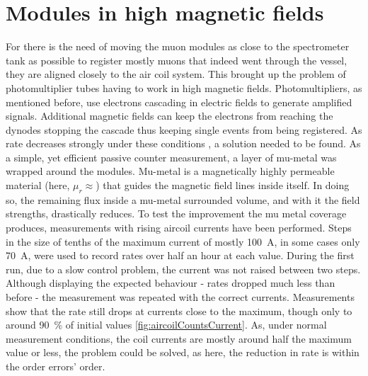   \section{Modules in high magnetic fields}
  \label{ch:Analysis:sec:Modules in high magnetic fields}
  For there is the need of moving the muon modules as close to the spectrometer tank as possible to register mostly muons that indeed went through the vessel, they are aligned closely to the air coil system. This brought up the problem of photomultiplier tubes having to work in high magnetic fields. Photomultipliers, as mentioned before, use electrons cascading in electric fields to generate amplified signals. Additional magnetic fields can keep the electrons from reaching the dynodes stopping the cascade thus keeping single events from being registered. As rate decreases strongly under these conditions , a solution needed to be found. As a simple, yet efficient passive counter measurement, a layer of mu-metal was wrapped around the modules. Mu-metal is a magnetically highly permeable material (here, $\mu_r\approx $) that guides the magnetic field lines inside itself. In doing so, the remaining flux inside a mu-metal surrounded volume, 
and with it the field strengths, drastically reduces.
  To test the improvement the mu metal coverage produces, measurements with rising aircoil currents have been performed.
  Steps in the size of tenths of the maximum current of mostly \SI{100}{\ampere}, in some cases only \SI{70}{\ampere}, were used to record rates over half an hour at each value.
  During the first run, due to a slow control problem, the current was not raised between two steps. Although displaying the expected behaviour - rates dropped much less than before - the measurement was repeated with the correct currents.
  Measurements show that the rate still drops at currents close to the maximum, though only to around \SI{90}{\percent} of initial values \ref{fig:aircoilCountsCurrent}. As, under normal measurement conditions, the coil currents are mostly around half the maximum value or less, the problem could be solved, as here, the reduction in rate is within the order errors' order.

